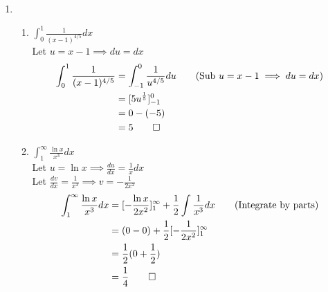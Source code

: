 \documentclass[12pt, a4paper]{article}
\begin{document}
\begin{enumerate}[Q\arabic*.]
    \pagebreak
  \item 
    \begin{enumerate}[(\alph*)]
      \item $\displaystyle \int^1_0 \frac{1}{(x-1)^{4/5}} dx$\\
        Let $u = x-1 \implies du = dx$
       \begin{align*}
         \int^1_0 \frac{1}{(x-1)^{4/5}} &= \int^0_{-1} \frac{1}{u^{4/5}} du \tag*{(Sub $u = x-1 \implies du=dx$)}\\
                                        &= [5u^{\frac{1}{5}}]^0_{-1}\\
                                        &= 0 - (-5)\\
                                        &= 5\qed
       \end{align*}

      \item $\displaystyle \int^{\infty}_1 \frac{\ln x}{x^3} dx$\\
        Let $\displaystyle u = \ln x \implies \frac{du}{dx}= \frac{1}{x}dx$\\
        Let $\displaystyle \frac{dv}{dx} = \frac{1}{x^3} \implies v = -\frac{1}{2x^2}$
        \begin{align*}
          \int^{\infty}_1 \frac{\ln x}{x^3} dx &= [-\frac{\ln x}{2x^2}]^{\infty}_1 + \frac{1}{2}\int \frac{1}{x^3}dx \tag*{(Integrate by parts)}\\
                                               &= (0 - 0) + \frac{1}{2}[-\frac{1}{2x^2}]^{\infty}_1\\
                                               &= \frac{1}{2}(0 + \frac{1}{2})\\
                                               &= \frac{1}{4} \qed
        \end{align*}
    \end{enumerate}
\end{enumerate}
\end{document}

